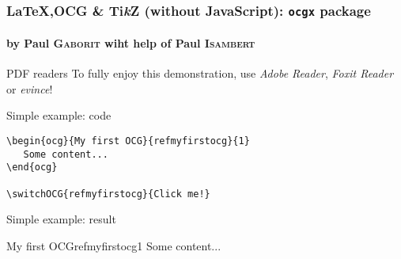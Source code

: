 \documentclass[11pt]{beamer}
\newcommand\latex{{\rmfamily\LaTeX}}
\begin{document}
\begin{frame}[fragile]
  \frametitle{\latex,OCG \& Ti\emph{k}Z (without JavaScript): \texttt{ocgx} package}
  \framesubtitle{by Paul \textsc{Gaborit} wiht help of Paul
    \textsc{Isambert}}

  \begin{alertblock}{PDF readers}
    To fully enjoy this demonstration, use \emph{Adobe Reader},
    \emph{Foxit Reader} or \emph{evince}!
  \end{alertblock}

  \begin{block}{Simple example: code}
    \begin{lstlisting}[style=TeXcode]
\begin{ocg}{My first OCG}{refmyfirstocg}{1}
   Some content...
\end{ocg}

\switchOCG{refmyfirstocg}{Click me!}
\end{lstlisting}
  \end{block}

  \begin{block}{Simple example: result}
    
    \begin{ocg}{My first OCG}{refmyfirstocg}{1}
      Some content...
    \end{ocg}
    

  \end{block}
\end{frame}
\end{document}
